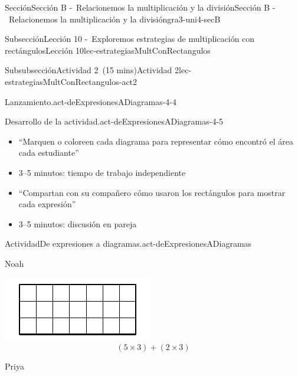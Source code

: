 \documentclass[oneside,10pt,]{article}
\begin{document}
\begin{sectionptx}{Sección}{Sección B -~Relacionemos la multiplicación y la división}{}{Sección B -~Relacionemos la multiplicación y la división}{}{}{gra3-uni4-secB}
\begin{subsectionptx}{Subsección}{Lección 10 -~Exploremos estrategias de multiplicación con rectángulos}{}{Lección 10}{}{}{lec-estrategiasMultConRectangulos}
\begin{subsubsectionptx}{Subsubsección}{Actividad 2~(15 mins)}{}{Actividad 2}{}{}{lec-estrategiasMultConRectangulos-act2}
\begin{paragraphs}{Lanzamiento.}{act-deExpresionesADiagramas-4-4}
\end{paragraphs}%
\begin{paragraphs}{Desarrollo de la actividad.}{act-deExpresionesADiagramas-4-5}%
%
\begin{itemize}[label=\textbullet]
\item{}``Marquen o coloreen cada diagrama para representar cómo encontró el área cada estudiante''%
\item{}3–5 minutos: tiempo de trabajo independiente%
\item{}``Compartan con su compañero cómo usaron los rectángulos para mostrar cada expresión''%
\item{}3–5 minutos: discusión en pareja%
\end{itemize}
\end{paragraphs}%
\begin{activity}{Actividad}{De expresiones a diagramas.}{act-deExpresionesADiagramas}%
\begin{sidebyside}{3}{0.0166666666666667}{0.0166666666666667}{0.0333333333333333}%
\begin{sbspanel}{0.3}%
Noah%
\par
\includegraphics[width=\linewidth]{external/svg-source/tikz-file-153051.pdf}
%
\begin{equation*}
(5\times 3)+(2 \times 3)
\end{equation*}
%
\end{sbspanel}%
\begin{sbspanel}{0.3}%
Priya%
\par

\end{sbspanel}
\end{sidebyside}
\end{activity}
\end{subsubsectionptx}
\end{subsectionptx}
\end{sectionptx}
\end{document}
